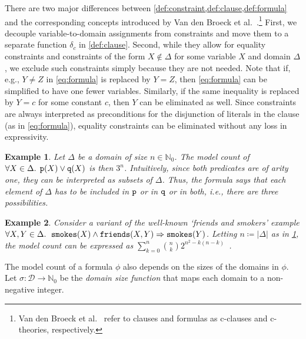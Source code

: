 \documentclass{article}
\newtheorem{example}{Example}
\newcommand{\predicate}{\texttt{\textup{p}}}
\newcommand{\predicateq}{\texttt{\textup{q}}}
\DeclareMathOperator{\friends}{\texttt{\textup{friends}}}
\DeclareMathOperator{\smokes}{\texttt{\textup{smokes}}}
\begin{document}
There are two major differences between
\cref{def:constraint,def:clause,def:formula} and the corresponding concepts
introduced by Van den Broeck et
al.~.\footnote{Van den Broeck et
  al.~ refer to clauses and formulas as
  c-clauses and c-theories, respectively.} First, we decouple variable-to-domain
assignments from constraints and move them to a separate function $\delta_{c}$
in \cref{def:clause}. Second, while they allow for equality constraints and
constraints of the form $X \not\in \Delta$ for some variable $X$ and domain
$\Delta$, we exclude such constraints simply because they are not needed. Note
that if, e.g., $Y \ne Z$ in \cref{eq:formula} is replaced by $Y = Z$, then
\cref{eq:formula} can be simplified to have one fewer variables. Similarly, if
the same inequality is replaced by $Y = c$ for some constant $c$, then $Y$ can
be eliminated as well. Since constraints are always interpreted as preconditions
for the disjunction of literals in the clause (as in \cref{eq:formula}),
equality constraints can be eliminated without any loss in expressivity.

\begin{example}\label{example:simple}
  Let $\Delta$ be a domain of size $n \in \mathbb{N}_{0}$. The model count of
  $\forall X \in \Delta\text{. } \predicate(X) \lor \predicateq(X)$ is then
  $3^{n}$. Intuitively, since both predicates are of arity one, they can be
  interpreted as subsets of $\Delta$. Thus, the formula says that each element
  of $\Delta$ has to be included in $\predicate$ or in $\predicateq$ or in both,
  i.e., there are three possibilities.
\end{example}

\begin{example}\label{example:smokers}
  Consider a variant of the well-known `friends and smokers' example
  $\forall X, Y \in \Delta\text{.
  } \smokes(X) \land \friends(X, Y) \Rightarrow \smokes(Y)$. Letting
  $n \coloneqq |\Delta|$ as in \cref{example:simple}, the model count can be
  expressed as
  $\sum_{k=0}^{n} \binom{n}{k}2^{n^{2} - k(n-k)}$~\cite{DBLP:conf/kr/BroeckMD14}.
\end{example}

The model count of a formula $\phi$ also depends on the sizes of the domains in
$\phi$. Let $\sigma\colon \mathcal{D} \to \mathbb{N}_{0}$ be the \emph{domain
  size function} that maps each domain to a non-negative integer.
\end{document}
